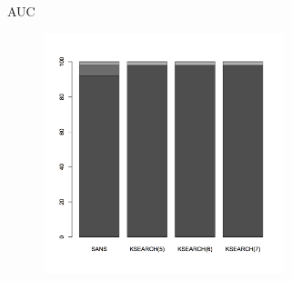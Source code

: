 \documentclass[xcolor=dvipsnames, aspectratio=1610]{beamer}
\begin{document}
\begin{frame}{AUC}
  \begin{figure}[h]
    \includegraphics[height=7cm]{img/auc_dia.png}
  \end{figure}
\end{frame}
\end{document}

